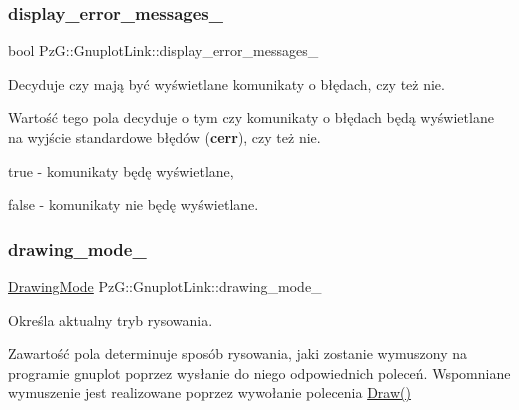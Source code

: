 \subsubsection{\texorpdfstring{display\+\_\+error\+\_\+messages\+\_\+}{display\_error\_messages\_}}
{\footnotesize\ttfamily bool Pz\+G\+::\+Gnuplot\+Link\+::display\+\_\+error\+\_\+messages\+\_\+\hspace{0.3cm}{\ttfamily [protected]}}



Decyduje czy mają być wyświetlane komunikaty o błędach, czy też nie. 

Wartość tego pola decyduje o tym czy komunikaty o błędach będą wyświetlane na wyjście standardowe błędów ({\bfseries cerr}), czy też nie. \begin{DoxyItemize}
\item {\ttfamily true} -\/ komunikaty będę wyświetlane, \item {\ttfamily false} -\/ komunikaty nie będę wyświetlane. \end{DoxyItemize}
\mbox{\label{class_pz_g_1_1_gnuplot_link_afe3cae0470049aee3c7350f488a630b6}} 
\subsubsection{\texorpdfstring{drawing\+\_\+mode\+\_\+}{drawing\_mode\_}}
{\footnotesize\ttfamily \hyperlink{namespace_pz_g_a4360c76a1dbf714a19a0d97fe56e0660}{Drawing\+Mode} Pz\+G\+::\+Gnuplot\+Link\+::drawing\+\_\+mode\+\_\+\hspace{0.3cm}{\ttfamily [protected]}}



Określa aktualny tryb rysowania. 

Zawartość pola determinuje sposób rysowania, jaki zostanie wymuszony na programie {\ttfamily gnuplot} poprzez wysłanie do niego odpowiednich poleceń. Wspomniane wymuszenie jest realizowane poprzez wywołanie polecenia \hyperlink{class_pz_g_1_1_gnuplot_link_a96321ba10f7ee9c5f55dd17a28143a39}{Draw()} \mbox{\label{class_pz_g_1_1_gnuplot_link_af4b03524d7d1ccb3f09524217048ef5d}} 
